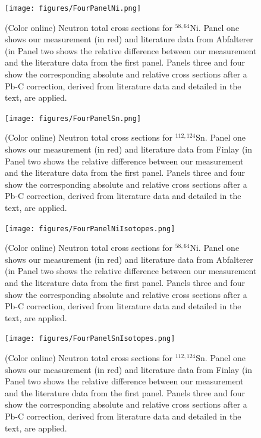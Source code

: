 \documentclass[twocolumn,secnumarabic,amssymb, nobibnotes, aps, prl,
superscriptaddress, nobalancelastpage]{revtex4}
\begin{document}
\begin{figure}
    \texttt{[image: figures/FourPanelNi.png]}
    \caption{(Color online) Neutron total cross sections for $^{58,64}$Ni.
     Panel one shows our measurement (in red) and literature data from
     Abfalterer (in %
     Panel two shows the relative difference between our 
     measurement and the literature data from the first panel. Panels three and
     four show the corresponding absolute and relative cross sections after a
     Pb-C correction, derived from literature data and detailed in the text,
     are applied.
    }
\end{figure}

\begin{figure}
    \texttt{[image: figures/FourPanelSn.png]}
    \caption{(Color online) Neutron total cross sections for $^{112,124}$Sn.
     Panel one shows our measurement (in red) and literature data from
     Finlay (in %
     Panel two shows the relative difference between our 
     measurement and the literature data from the first panel. Panels three and
     four show the corresponding absolute and relative cross sections after a
     Pb-C correction, derived from literature data and detailed in the text,
     are applied.
    }
\end{figure}

\begin{figure}
    \texttt{[image: figures/FourPanelNiIsotopes.png]}
    \caption{(Color online) Neutron total cross sections for $^{58,64}$Ni.
     Panel one shows our measurement (in red) and literature data from
     Abfalterer (in %
     Panel two shows the relative difference between our 
     measurement and the literature data from the first panel. Panels three and
     four show the corresponding absolute and relative cross sections after a
     Pb-C correction, derived from literature data and detailed in the text,
     are applied.
    }
\end{figure}

\begin{figure}
    \texttt{[image: figures/FourPanelSnIsotopes.png]}
    \caption{(Color online) Neutron total cross sections for $^{112,124}$Sn.
     Panel one shows our measurement (in red) and literature data from
     Finlay (in %
     Panel two shows the relative difference between our 
     measurement and the literature data from the first panel. Panels three and
     four show the corresponding absolute and relative cross sections after a
     Pb-C correction, derived from literature data and detailed in the text,
     are applied.
    }
\end{figure}
\end{document}
